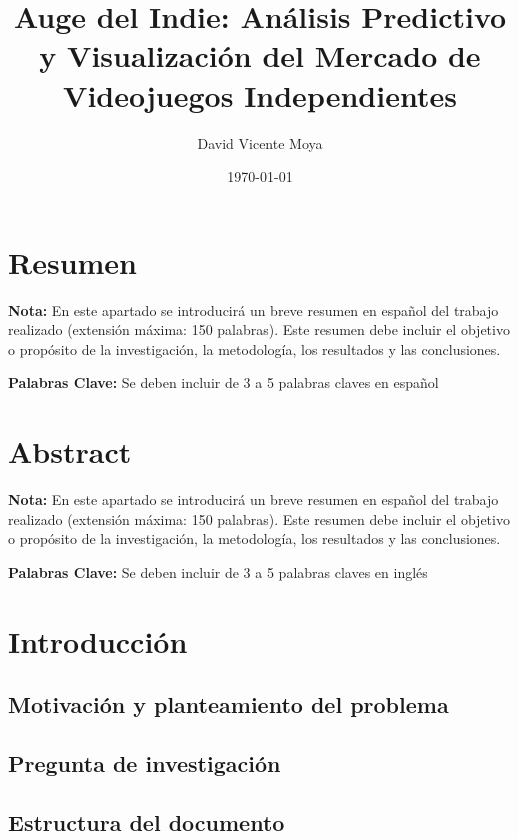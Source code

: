\documentclass[11pt,a4paper,spanish]{book}
\title{Auge del Indie: Análisis Predictivo y Visualización del Mercado 
de Videojuegos Independientes}
\author{David Vicente Moya}
\date{\today}
\numberwithin{equation}{chapter}
\numberwithin{figure}{chapter}
\begin{document}
\renewcommand{\listfigurename}{Índice de Ilustraciones}
\renewcommand{\listtablename}{Índice de Tablas}
\renewcommand{\contentsname}{Índice de Contenidos}
\renewcommand{\figurename}{Figura}
\renewcommand{\tablename}{Tabla} 

\maketitle

\frontmatter
\tableofcontents
\listoffigures
\listoftables

\chapter{Resumen}
{\bf Nota:} En este apartado se introducirá un breve resumen en 
español del trabajo realizado (extensión máxima: 150 palabras). 
Este resumen debe incluir el objetivo o propósito de la investigación, 
la metodología, los resultados y las conclusiones.


{\bf Palabras Clave:} Se deben incluir de 3 a 5 palabras claves en 
español

\chapter{Abstract}
{\bf Nota:} En este apartado se introducirá un breve resumen en 
español del trabajo realizado (extensión máxima: 150 palabras). Este 
resumen debe incluir el objetivo o propósito de la investigación, la 
metodología, los resultados y las conclusiones.


{\bf Palabras Clave:} Se deben incluir de 3 a 5 palabras claves en 
inglés




\mainmatter
\chapter{Introducción}
\section{Motivación y planteamiento del problema}
\section{Pregunta de investigación}
\section{Estructura del documento}
\end{document}
